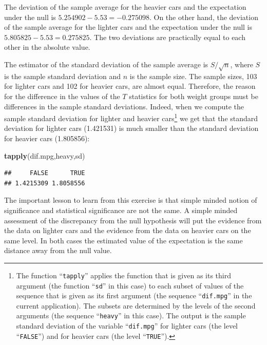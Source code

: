 \documentclass[]{krantz}
\makeatletter
\newenvironment{Shaded}{\begin{snugshade}}{\end{snugshade}}
\newcommand{\KeywordTok}[1]{\textcolor[rgb]{0.13,0.29,0.53}{\textbf{#1}}}
\newcommand{\NormalTok}[1]{#1}
\newenvironment{kframe}{%
\medskip{}
\setlength{\fboxsep}{.8em}
 \def\at@end@of@kframe{}%
 \ifinner\ifhmode%
  \def\at@end@of@kframe{\end{minipage}}%
  \begin{minipage}{\columnwidth}%
 \fi\fi%
 \def\FrameCommand##1{\hskip\@totalleftmargin \hskip-\fboxsep
 \colorbox{shadecolor}{##1}\hskip-\fboxsep
     \hskip-\linewidth \hskip-\@totalleftmargin \hskip\columnwidth}%
 \MakeFramed {\advance\hsize-\width
   \@totalleftmargin\z@ \linewidth\hsize
   \@setminipage}}%
 {\par\unskip\endMakeFramed%
 \at@end@of@kframe}
\renewenvironment{Shaded}{\begin{kframe}}{\end{kframe}}
\theoremstyle{definition}
\theoremstyle{definition}
\theoremstyle{definition}
\theoremstyle{remark}
\makeatother
\begin{document}
The deviation of the sample average for the heavier cars and the
expectation under the null is \(5.254902 - 5.53 = -0.275098\). On the
other hand, the deviation of the sample average for the lighter cars and
the expectation under the null is \(5.805825 - 5.53 = 0.275825\). The
two deviations are practically equal to each other in the absolute
value.

The estimator of the standard deviation of the sample average is
\(S/\sqrt{n}\), where \(S\) is the sample standard deviation and \(n\)
is the sample size. The sample sizes, 103 for lighter cars and 102 for
heavier cars, are almost equal. Therefore, the reason for the difference
in the values of the \(T\) statistics for both weight groups must be
differences in the sample standard deviations. Indeed, when we compute
the sample standard deviation for lighter and heavier cars\footnote{The
  function ``\texttt{tapply}'' applies the function that is given as its
  third argument (the function ``\texttt{sd}'' in this case) to each
  subset of values of the sequence that is given as its first argument
  (the sequence ``\texttt{dif.mpg}'' in the current application). The
  subsets are determined by the levels of the second arguments (the
  sequence ``\texttt{heavy}'' in this case). The output is the sample
  standard deviation of the variable ``\texttt{dif.mpg}'' for lighter
  cars (the level ``\texttt{FALSE}'') and for heavier cars (the level
  ``\texttt{TRUE}'').} we get that the standard deviation for lighter
cars (1.421531) is much smaller than the standard deviation for heavier
cars (1.805856):

\begin{Shaded}
\begin{Highlighting}[]
\KeywordTok{tapply}\NormalTok{(dif.mpg,heavy,sd)}
\end{Highlighting}
\end{Shaded}

\begin{verbatim}
##     FALSE      TRUE 
## 1.4215309 1.8058556
\end{verbatim}

The important lesson to learn from this exercise is that simple minded
notion of significance and statistical significance are not the same. A
simple minded assessment of the discrepancy from the null hypothesis
will put the evidence from the data on lighter cars and the evidence
from the data on heavier cars on the same level. In both cases the
estimated value of the expectation is the same distance away from the
null value.
\end{document}
